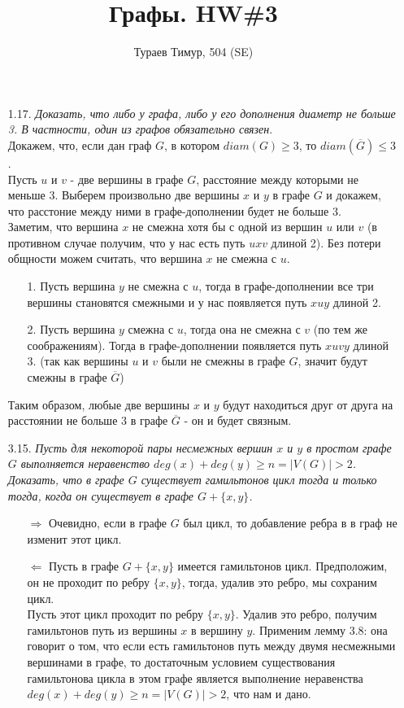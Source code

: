 \documentclass[10pt,a4paper]{article}
\begin{document}
\title{Графы. HW\#3} 
\author{Тураев Тимур, 504 (SE)} 
\maketitle 
\begin{enumerate}
	\item[1.17.] \textit{Доказать, что либо у графа, либо у его дополнения диаметр не больше 3. В частности, один из графов обязательно связен}.\\
	Докажем, что, если дан граф $G$, в котором $diam(G) \geqslant 3$, то $diam(\overline{G}) \leqslant 3$.\\
	Пусть $u$ и $v$ - две вершины в графе $G$, расстояние между которыми не меньше 3. Выберем произвольно две вершины $x$ и $y$ в графе $G$ и докажем, что расстоние между ними в графе-дополнении будет не больше 3.\\
	Заметим, что вершина $x$ не смежна хотя бы с одной из вершин $u$ или $v$ (в противном случае получим, что у нас есть путь $uxv$ длиной 2). Без потери общности можем считать, что вершина $x$ не смежна с $u$.
	\begin{enumerate}
	\item[1.] Пусть вершина $y$ не смежна с $u$, тогда в графе-дополнении все три вершины становятся смежными и у нас появляется путь $xuy$ длиной 2.
	\item[2.] Пусть вершина $y$ смежна с $u$, тогда она не смежна с $v$ (по тем же соображениям). Тогда в графе-дополнении появляется путь $xuvy$ длиной 3. (так как вершины $u$ и $v$ были не смежны в графе $G$, значит будут смежны в графе $\overline{G}$)	
	\end{enumerate}
	Таким образом, любые две вершины $x$ и $y$ будут находиться друг от друга на расстоянии не больше 3 в графе $\overline{G}$ - он и будет связным.
	
	\item[3.15.] \textit{Пусть для некоторой пары несмежных вершин $x$ и $y$ в простом графе $G$ выполняется неравенство $deg(x)+deg(y) \geqslant n = |V(G)| > 2$. Доказать, что в графе $G$ существует гамильтонов цикл тогда и только тогда, когда он существует в графе $G+\{x,y\}$.}
	\begin{enumerate}
		\item[$\Rightarrow$] Очевидно, если в графе $G$ был цикл, то добавление ребра в в граф не изменит этот цикл.
		
		\item[$\Leftarrow$] Пусть в графе $G+\{x,y\}$ имеется гамильтонов цикл. Предположим, он не проходит по ребру $\{x,y\}$, тогда, удалив это ребро, мы сохраним цикл.\\
		Пусть этот цикл проходит по ребру $\{x,y\}$. Удалив это ребро, получим гамильтонов путь из вершины $x$ в вершину $y$. Применим лемму 3.8: она говорит о том, что если есть гамильтонов путь между двумя несмежными вершинами в графе, то достаточным условием существования гамильтонова цикла в этом графе является выполнение неравенства $deg(x)+deg(y) \geqslant n = |V(G)| > 2$, что нам и дано.
	\end{enumerate}	
	

\end{enumerate}
\end{document}
